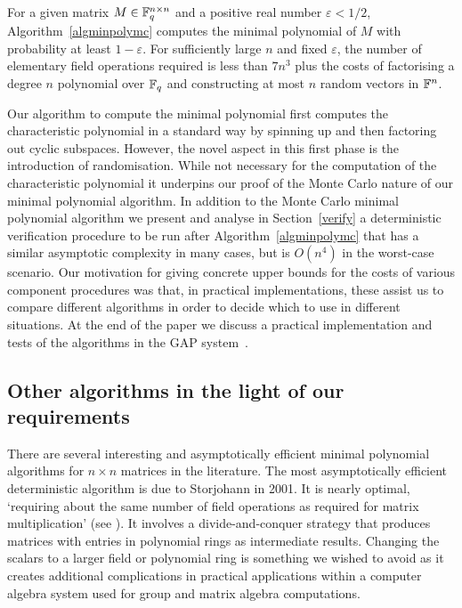 \begin{Theo}\label{main}
For a given matrix $M \in \mathbb{F}_q^{n \times n}$ and a positive 
real number $\varepsilon < 1/2$, Algorithm~\ref{algminpolymc}
computes the minimal polynomial of $M$ with probability at least $1-\varepsilon$.
For sufficiently large $n$ and fixed $\varepsilon$, the number of elementary 
field operations required is less than $7n^3$ plus the costs of 
factorising a degree $n$ polynomial over $\mathbb{F}_q$ and constructing at most $n$
random vectors in $\mathbb{F}^n$.
\end{Theo}


Our algorithm to compute the minimal polynomial first computes the
characteristic polynomial in a standard way by spinning up and then
factoring out cyclic
subspaces. However, the novel aspect in this first phase
is the introduction of randomisation. While
not necessary for the computation of the characteristic polynomial
it underpins our proof of the Monte Carlo 
nature of our minimal polynomial algorithm. In addition to the Monte Carlo
minimal polynomial algorithm
we present and analyse in Section~\ref{verify} a deterministic
verification procedure to
%
be run after Algorithm~\ref{algminpolymc} that has a similar asymptotic
complexity in many cases, but is $O(n^4)$ in the worst-case scenario.
Our motivation for giving concrete upper bounds for the costs of 
various component procedures was that, in practical implementations, 
these assist us to compare different algorithms in order to 
decide which to use in different situations. At the end of the paper we discuss
a practical implementation and tests of the algorithms in the {\sf GAP}
system~\cite{GAP4}.

\subsection{Other algorithms in the light of our requirements}

There are several interesting and asymptotically efficient
minimal polynomial algorithms for $n\times n$ matrices in the literature. The most  
asymptotically efficient deterministic algorithm is due to Storjohann 
\cite{Stor01} in 2001. It is nearly optimal, `requiring about the same number of 
field operations as required for matrix 
multiplication' (see \cite[Abstract, p368]{Stor01}). 
It involves a divide-and-conquer strategy that produces matrices 
with entries in polynomial rings as intermediate results. 
Changing the scalars to a larger field or polynomial ring is 
something we wished to avoid as it creates additional complications in practical 
applications within a computer algebra system used for group and 
matrix algebra computations.

